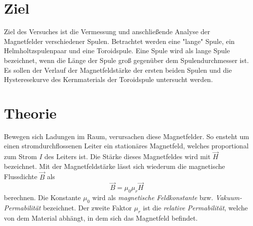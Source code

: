 \section{Ziel}
\label{sec:Ziel}
Ziel des Versuches ist die Vermessung und anschließende Analyse der Magnetfelder verschiedener Spulen. Betrachtet werden eine "lange" \: Spule, ein Helmholtzspulenpaar und eine 
Toroidspule. Eine Spule wird als lange Spule bezeichnet, wenn die Länge der Spule groß gegenüber dem Spulendurchmesser ist.
Es sollen der Verlauf der Magnetfeldstärke der ersten beiden Spulen und die Hysteresekurve des Kernmaterials der Toroidspule untersucht werden.

\section{Theorie}
\label{sec:Theorie}
Bewegen sich Ladungen im Raum, verursachen diese Magnetfelder. So ensteht um einen stromdurchflossenen Leiter ein stationäres Magnetfeld, welches proportional zum Strom 
$I$ des Leiters ist. Die Stärke dieses Magnetfeldes wird mit $\vec{H}$ bezeichnet. Mit der Magnetfeldstärke lässt sich wiederum die magnetische Flussdichte $\vec{B}$ als 
\begin{equation}
    \label{eqn:Flussdichte}
    \vec{B} = \mu_0 \mu_r \vec{H}
\end{equation} 
berechnen. Die Konstante $\mu_0$ wird als \textit{magnetische Feldkonstante} bzw. \textit{Vakuum-Permabilität} bezeichnet. Der zweite Faktor $\mu_r$ ist die 
\textit{relative Permabilität}, welche von dem Material abhängt, in dem sich das Magnetfeld befindet. 

